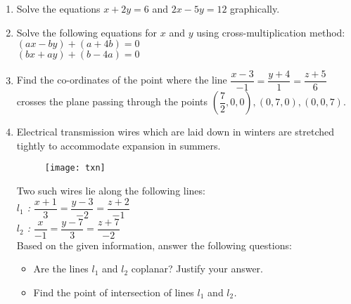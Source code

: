 %
\begin{enumerate}
	\item Solve the equations $x+2y=6$ and $2x-5y=12$ graphically.
	\vspace{4mm}
\item Solve the following equations for $x$ and $y$ using cross-multiplication method:\\
	\indent\indent\indent$(ax-by)+(a+4b)=0$\\\indent\indent$(bx+ay)+(b-4a)=0$
		\vspace{4mm}
\item Find the co-ordinates of the point where the line $\dfrac{x-3}{-1}=\dfrac{y+4}{1}=\dfrac{z+5}{6}$ crosses the plane passing through the points $\left(\dfrac{7}{2},0,0\right),(0,7,0),(0,0,7)$.
	\vspace{4mm}
\item Electrical transmission wires which are laid down in winters are stretched tightly to accommodate expansion in summers.\\
	\begin{figure}[H]
		\centering
		\texttt{[image: txn]}\\
	\end{figure}
	Two such wires lie along the following lines:
\vspace{2.4mm}\\
	{\itshape\rmfamily $l_1$ : }$\dfrac{x+1}{3}=\dfrac{y-3}{-2}=\dfrac{z+2}{-1}$\vspace{1.35mm}\\
	{\itshape\rmfamily $l_2$ : }$\dfrac{x}{-1}=\dfrac{y-7}{3}=\dfrac{z+7}{-2}$\vspace{4.7mm}\\
	Based on the given information, answer the following questions:
			\begin{itemize}
				\item	Are the lines {\itshape\rmfamily $l_1$} and {\itshape\rmfamily $l_2$} coplanar? Justify your answer.
				\item    Find the point of intersection of lines {\itshape\rmfamily $l_1$} and {\itshape\rmfamily $l_2$.}

\end{itemize}
\end{enumerate}
